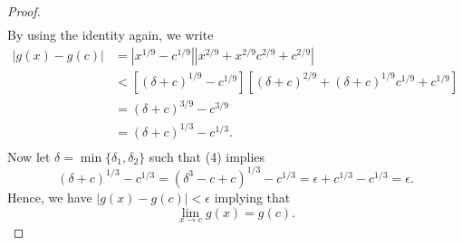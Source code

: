 \begin{enumerate}
\begin{proof}
\begin{align*}
        \end{align*}
        By using the identity again, we write
        \begin{align*}
            | g(x) - g(c) | &= | x^{1/9} - c^{1/9} | | x^{2/9} + x^{2/9}c^{2/9} + c^{2/9} |  \\
                            &< [(\delta + c)^{1/9} - c^{1/9} ] [(\delta + c )^{2/9} + (\delta + c )^{1/9} c^{1/9} + c^{1/9}] \\
                            &= (\delta + c )^{3/9} - c^{3/9}  \\  
                            &= (\delta + c)^{1/3} - c^{1/3}.  \tag{4} \\
        \end{align*}
        Now let \( \delta = \min \{ \delta_1, \delta_2  \}  \) such that (4) implies
        \[ (\delta + c)^{1/3} - c^{1/3} = (\delta^3 - c + c )^{1/3} - c^{1/3} = \epsilon + c^{1/3} - c^{1/3} = \epsilon. \]
        Hence, we have \( | g(x) - g(c) | < \epsilon  \) implying that
        \[ \lim_{ x \to c } g(x) = g(c). \] 
        \end{proof}
\end{enumerate}

